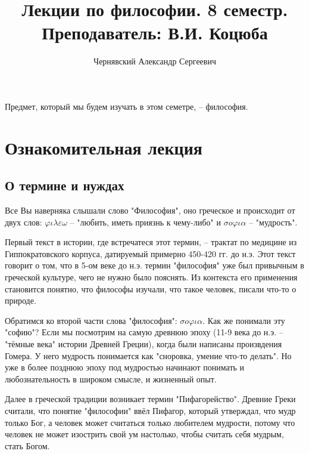 \documentclass[a4paper, 12pt]{book} %
\author{Чернявский Александр Сергеевич}
\title {Лекции по философии. 8 семестр. Преподаватель: В.И. Коцюба}
\begin{document}
\maketitle

\tableofcontents 
{}
\newpage
Предмет, который мы будем изучать в этом семетре, -- философия. 

\section{Ознакомительная лекция}
\subsection{О термине и нуждах}
Все Вы наверняка слышали слово "Философия", оно греческое и происходит от двух слов: $\varphi \iota \lambda \varepsilon \omega $ -- "любить, иметь приязнь к чему-либо" и
 $\sigma o \varphi \iota \alpha$ -- "мудрость".
 
Первый текст в истории, где встречатеся этот  термин, -- трактат по медицине из Гиппократовского корпуса, датируемый примерно 450-420 гг. до н.э. Этот текст говорит о том, что в 5-ом веке до н.э. термин "философия" уже был привычным в греческой культуре, чего не нужно было пояснять. Из контекста его применения становится понятно, что философы изучали, что такое человек, писали что-то о природе. 

Обратимся ко второй части слова "философия": $\sigma o \varphi \iota \alpha$. Как же понимали эту "софию"? Если мы посмотрим на самую древнюю эпоху (11-9 века до н.э. -- "тёмные века" истории Древней Греции), когда были написаны произвдения Гомера. У него мудрость понимается как "сноровка, умение что-то делать". Но уже в более позднюю эпоху под мудростью начинают понимать и любознательность в широком смысле, и жизненный опыт.

Далее в греческой традиции возникает термин "Пифагорейство". Древние Греки считали, что понятие "философии" ввёл Пифагор, который утверждал, что мудр только Бог, а человек может считаться только любителем мудрости, потому что человек не может изострить свой ум настолько, чтобы считать себя мудрым, стать Богом. 
\end{document}
